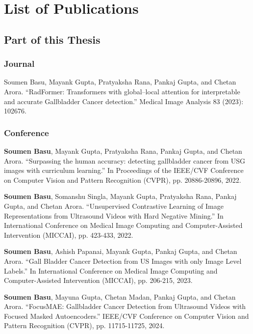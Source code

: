 
\chapter*{List of Publications}
\section*{Part of this Thesis}
\subsection*{Journal}
\begin{enumerate}[label={[J.\arabic*]}]
    \item Soumen Basu, Mayank Gupta, Pratyaksha Rana, Pankaj Gupta, and Chetan Arora. ``RadFormer: Transformers with global–local attention for interpretable and accurate Gallbladder Cancer detection.'' Medical Image Analysis 83 (2023): 102676.
\end{enumerate}

\subsection*{Conference}
\begin{enumerate}[label={[C.\arabic*]}]
    \item \textbf{Soumen Basu}, Mayank Gupta, Pratyaksha Rana, Pankaj Gupta, and Chetan Arora. ``Surpassing the human accuracy: detecting gallbladder cancer from USG images with curriculum learning.'' In Proceedings of the IEEE/CVF Conference on Computer Vision and Pattern Recognition (CVPR), pp. 20886-20896, 2022.
    \item \textbf{Soumen Basu}, Somanshu Singla, Mayank Gupta, Pratyaksha Rana, Pankaj Gupta, and Chetan Arora. ``Unsupervised Contrastive Learning of Image Representations from Ultrasound Videos with Hard Negative Mining.'' In International Conference on Medical Image Computing and Computer-Assisted Intervention (MICCAI), pp. 423-433, 2022.
    \item \textbf{Soumen Basu}, Ashish Papanai, Mayank Gupta, Pankaj Gupta, and Chetan Arora. ``Gall Bladder Cancer Detection from US Images with only Image Level Labels.'' In International Conference on Medical Image Computing and Computer-Assisted Intervention (MICCAI), pp. 206-215, 2023.
    \item \textbf{Soumen Basu}, Mayuna Gupta, Chetan Madan, Pankaj Gupta, and Chetan Arora. ``FocusMAE: Gallbladder Cancer Detection from Ultrasound Videos with Focused Masked Autoencoders.'' IEEE/CVF Conference on Computer Vision and Pattern Recognition (CVPR), pp. 11715-11725, 2024.
\end{enumerate}

